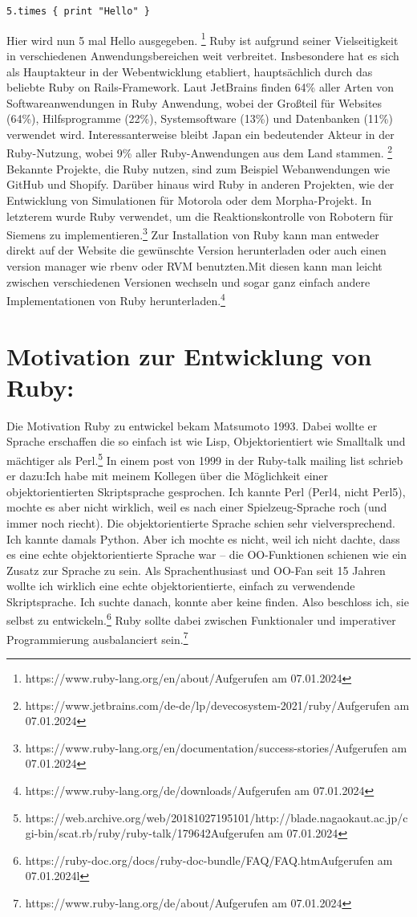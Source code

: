 \documentclass{article}
\begin{document}
\begin{lstlisting}
5.times { print "Hello" }
\end{lstlisting}
Hier wird nun 5 mal Hello ausgegeben.
\footnote{https://www.ruby-lang.org/en/about/Aufgerufen am 07.01.2024}
Ruby ist aufgrund seiner Vielseitigkeit in verschiedenen Anwendungsbereichen weit verbreitet. Insbesondere hat es sich als Hauptakteur in der Webentwicklung etabliert, hauptsächlich durch das beliebte Ruby on Rails-Framework. Laut JetBrains finden 64\% aller Arten von Softwareanwendungen in Ruby Anwendung, wobei der Großteil für Websites (64\%), Hilfsprogramme (22\%), Systemsoftware (13\%) und Datenbanken (11\%) verwendet wird.
Interessanterweise bleibt Japan ein bedeutender Akteur in der Ruby-Nutzung, wobei 9\% aller Ruby-Anwendungen aus dem Land stammen. \footnote{https://www.jetbrains.com/de-de/lp/devecosystem-2021/ruby/Aufgerufen am 07.01.2024}
Bekannte Projekte, die Ruby nutzen, sind zum Beispiel Webanwendungen wie GitHub und Shopify. Darüber hinaus wird Ruby in anderen Projekten, wie der Entwicklung von Simulationen für Motorola oder dem Morpha-Projekt. In letzterem wurde Ruby verwendet, um die Reaktionskontrolle von Robotern für Siemens zu implementieren.\footnote{https://www.ruby-lang.org/en/documentation/success-stories/Aufgerufen am 07.01.2024}
Zur Installation von Ruby kann man entweder direkt auf der Website die gewünschte Version herunterladen oder auch einen version manager wie rbenv oder RVM benutzten.Mit diesen kann man leicht zwischen verschiedenen Versionen wechseln und sogar ganz einfach andere Implementationen von Ruby herunterladen.\footnote{https://www.ruby-lang.org/de/downloads/Aufgerufen am 07.01.2024}
\section*{Motivation zur Entwicklung von Ruby:}
Die Motivation Ruby zu entwickel bekam Matsumoto 1993. Dabei wollte er Sprache erschaffen die so einfach ist wie Lisp, Objektorientiert wie Smalltalk und mächtiger als Perl.\footnote{https://web.archive.org/web/20181027195101/http://blade.nagaokaut.ac.jp/cgi-bin/scat.rb/ruby/ruby-talk/179642Aufgerufen am 07.01.2024}
In einem post von 1999 in der Ruby-talk mailing list schrieb er dazu:\glqq Ich habe mit meinem Kollegen über die Möglichkeit einer objektorientierten Skriptsprache gesprochen. Ich kannte Perl (Perl4, nicht Perl5), mochte es aber nicht wirklich, weil es nach einer Spielzeug-Sprache roch (und immer noch riecht). Die objektorientierte Sprache schien sehr vielversprechend. Ich kannte damals Python. Aber ich mochte es nicht, weil ich nicht dachte, dass es eine echte objektorientierte Sprache war – die OO-Funktionen schienen wie ein Zusatz zur Sprache zu sein. Als Sprachenthusiast und OO-Fan seit 15 Jahren wollte ich wirklich eine echte objektorientierte, einfach zu verwendende Skriptsprache. Ich suchte danach, konnte aber keine finden. Also beschloss ich, sie selbst zu entwickeln.\grqq{}\footnote{https://ruby-doc.org/docs/ruby-doc-bundle/FAQ/FAQ.htmAufgerufen am 07.01.2024l}
Ruby sollte dabei zwischen Funktionaler und imperativer Programmierung ausbalanciert sein.\footnote{https://www.ruby-lang.org/de/about/Aufgerufen am 07.01.2024}
\end{document}
